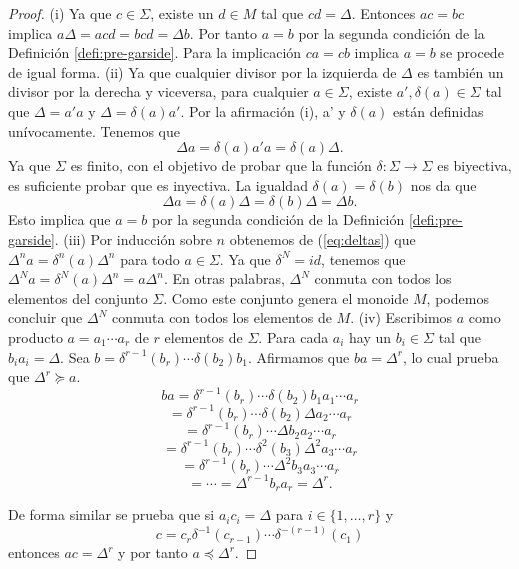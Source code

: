 \documentclass[12pt]{book}
\theoremstyle{definition}
\begin{document}
\begin{proof} (i) Ya que $c\in\Sigma$, existe un $d\in M$ tal que $cd=\Delta$. Entonces $ac=bc$ implica $a\Delta = acd=bcd=\Delta b$. Por tanto $a=b$ por la segunda condición de la Definición \ref{defi:pre-garside}. Para la implicación $ca=cb$ implica $ a=b$ se procede de igual forma.
\newline
\newline
(ii) Ya que cualquier divisor por la izquierda de $\Delta$ es también un divisor por la derecha y viceversa, para cualquier $a\in\Sigma$, existe $a',\delta(a)\in\Sigma$ tal que $\Delta =a'a$ y $\Delta = \delta(a)a'$. Por la afirmación (i), a' y $\delta(a)$ están definidas unívocamente. Tenemos que
\begin{equation}
\Delta a=\delta(a)a'a=\delta(a)\Delta.
\label{eq:deltas}
\end{equation}
Ya que $\Sigma$ es finito, con el objetivo de probar que la función $\delta:\Sigma\rightarrow\Sigma$ es biyectiva, es suficiente probar que es inyectiva. La igualdad $\delta(a)=\delta(b)$ nos da que
$$\Delta a= \delta(a)\Delta = \delta(b)\Delta = \Delta b.$$
Esto implica que $a=b$ por la segunda condición de la Definición \ref{defi:pre-garside}.
\newline
\newline
(iii) Por inducción sobre $n$ obtenemos de (\ref{eq:deltas}) que $\Delta^na=\delta^n(a)\Delta^n$ para todo $a\in\Sigma$. Ya que $\delta^N=id$, tenemos que $\Delta^N a=\delta^N(a)\Delta^n=a\Delta^n$. En otras palabras, $\Delta^N$ conmuta con todos los elementos del conjunto $\Sigma$. Como este conjunto genera el monoide $M$, podemos concluir que $\Delta^N$ conmuta con todos los elementos de $M$.
\newline
\newline
(iv) Escribimos $a$ como producto $a=a_1\cdots a_r$ de $r$ elementos de $\Sigma$. Para cada $a_i$ hay un $b_i\in\Sigma$ tal que $b_ia_i=\Delta$. Sea $b=\delta^{r-1}(b_r)\cdots\delta(b_2)b_1$. Afirmamos que $ba=\Delta^r$, lo cual prueba que $\Delta^r\succeq a$.
$$ba=\delta^{r-1}(b_r)\cdots\delta(b_2)b_1a_1\cdots a_r$$
$$=\delta^{r-1}(b_r)\cdots\delta(b_2)\Delta a_2\cdots a_r$$
$$=\delta^{r-1}(b_r)\cdots\Delta b_2a_2\cdots a_r$$
$$=\delta^{r-1}(b_r)\cdots\delta^2(b_3)\Delta^2 a_3\cdots a_r$$
$$=\delta^{r-1}(b_r)\cdots\Delta^2 b_3a_3\cdots a_r$$
$$=\cdots= \Delta^{r-1}b_ra_r=\Delta^r.$$

De forma similar se prueba que si $a_ic_i=\Delta$ para $i\in\{1,\ldots,r\}$ y
$$c=c_r\delta^{-1}(c_{r-1})\cdots\delta^{-(r-1)}(c_1)$$
entonces $ac=\Delta^r$ y por tanto $a\preceq\Delta^r$.
\end{proof}
\end{document}
